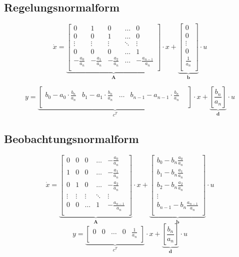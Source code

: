 \subsection{Regelungsnormalform}
\[
	\dot x=
	\underbrace{
		\begin{bmatrix}
			0 &	1 & 0 & \ldots & 0\\
			0 & 0 & 1 & \ldots & 0\\
			\vdots & \vdots & \vdots & \ddots & \vdots \\
			0 & 0 & 0 & \ldots & 1\\
			-\frac{a_0}{a_n} &-\frac{a_1}{a_n} & -\frac{a_2}{a_n} & \ldots &-\frac{a_{n-1}}{a_n}\\	
		\end{bmatrix}
	}_{\textbf{A}}
	\cdot x +
	\underbrace{
		\begin{bmatrix}
			0 \\
			0 \\
			\vdots \\
			0 \\
			\frac{1}{a_n} \\	
		\end{bmatrix}
	}_{\textbf{b}}
	\cdot u	
\]

\[
	y=
	\underbrace{
			\begin{bmatrix}
				b_0-a_0\cdot\frac{b_n}{a_n} & b_1-a_1\cdot\frac{b_n}{a_n} & \ldots & b_{n-1}-a_{n-1}\cdot\frac{b_n}{a_n} &\\
			\end{bmatrix}
	}_{\textbf{$c^T$}}
	\cdot x  +
	\underbrace{
		\left[ \frac{b_n}{a_n} \right] 
	}_{\textbf{d}}
	\cdot u
\]

\subsection{Beobachtungsnormalform}
\[
	\dot x=
	\underbrace{
		\begin{bmatrix}
			0 &	0 & 0 & \ldots & -\frac{a_0}{a_n}\\
			1 & 0 & 0 & \ldots & -\frac{a_1}{a_n}\\
			0 & 1 & 0 & \ldots & -\frac{a_2}{a_n}\\
			\vdots & \vdots & \vdots & \ddots & \vdots \\
			0 & 0 & \ldots & 1 &-\frac{a_{n-1}}{a_n}\\	
		\end{bmatrix}
	}_{\textbf{A}}
	\cdot x +
	\underbrace{
		\begin{bmatrix}
			b_0-b_n\frac{a_0}{a_n} \\
			b_1-b_n\frac{a_1}{a_n} \\
			b_2-b_n\frac{a_2}{a_n}  \\
			\vdots\\
			b_{n-1}-b_n\frac{a_{n-1}}{a_n}\\	
		\end{bmatrix}
	}_{\textbf{b}}
	\cdot u	
\]
\[
	y=
	\underbrace{
			\begin{bmatrix}
				0 & 0 & \ldots & 0 & \frac{1}{a_n}\\
			\end{bmatrix}
	}_{\textbf{$c^T$}}
	\cdot x  +
	\underbrace{
		\left[ \frac{b_n}{a_n} \right] 
	}_{\textbf{d}}
	\cdot u
\]
